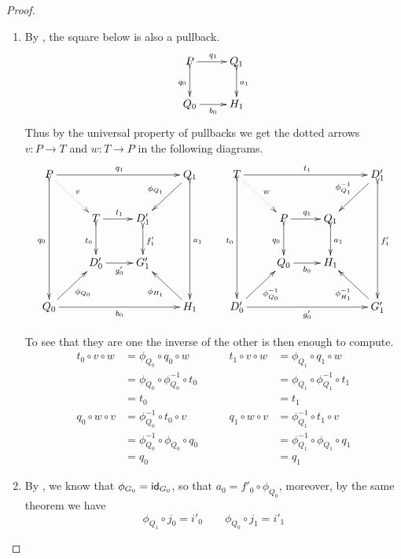 \begin{proof}
	\begin{enumerate}
		\item  By , the square below is also a pullback.
			\[\xymatrix{P \ar[r]^{q_1} \ar@{>->}[d]_{q_0} & Q_1 \ar@{>->}[d]^{a_1}\\ Q_0 \ar[r]_{b_0} & H_1}\]
			Thus by the universal property of pullbacks  we get the dotted arrows $v\colon P\to T$ and $w\colon T\to P$ in the following diagrams.
		\[\xymatrix{ P \ar@{.>}[dr]^{v} \ar[rrr]^{q_1} \ar@{>->}[ddd]_{q_0}&&& Q_1 \ar@{>->}[ddd]^{a_1} \ar[dl]_{\phi_{Q_1}}& T\ar@{.>}[dr]^{w}  \ar[rrr]^{t_1} \ar@{>->}[ddd]_{t_0}&&& D'_1 \ar[dl]_{\phi^{-1}_{Q_1}} \ar@{>->}[ddd]^{f'_1}\\&T \ar@{>->}[d]_{t_0}\ar[r]^{t_1}& D'_1 \ar@{>->}[d]^{f'_1} &&& P \ar@{>->}[d]_{q_0}\ar[r]^{q_1}& Q_1\ar@{>->}[d]^{a_1}\\ & D'_0\ar[r]_{g'_0} & G'_1 &&& Q_0 \ar[r]_{b_0}& H_1 \\Q_0 \ar[rrr]_{b_0} \ar[ur]_{\phi_{Q_0}}&&& H_1 \ar[ul]^{\phi_{H_1}} & D'_0 \ar[rrr]_{g'_0} \ar[ur]_{\phi^{-1}_{Q_0}}&&&G'_1 \ar[ul]^{\phi^{-1}_{H_1}}}\]

To see that they are one the inverse of the other is then enough to compute.
		\[\begin{split}
		t_0\circ v\circ w &=\phi_{Q_0}\circ q_0\circ w\\&=\phi_{Q_0}\circ \phi^{-1}_{Q_0} \circ t_0\\&=t_0\\q_0\circ w\circ v&=\phi^{-1}_{Q_0}	\circ t_0\circ v\\&=\phi^{-1}_{Q_0} \circ \phi_{Q_0}\circ q_0\\&=q_0 	\end{split}\qquad \begin{split}
		t_1\circ v\circ w &=\phi_{Q_1}\circ q_1\circ w\\&=\phi_{Q_1}\circ \phi^{-1}_{Q_1} \circ t_1\\&=t_1\\q_1\circ w\circ v&=\phi^{-1}_{Q_1}	\circ t_1\circ v\\&=\phi^{-1}_{Q_1} \circ \phi_{Q_1}\circ q_1\\&=q_1
		\end{split}\]
		
	\item By , we know that $\phi_{G_0}=\mathsf{id}_{G_0}$, so that $a_0=f'_0\circ \phi_{Q_0}$, moreover, by the same theorem we have 
	\[\phi_{Q_1}\circ j_0=i'_0 \qquad  \phi_{Q_0}\circ j_1=i'_1\] 
		

\end{enumerate}
\end{proof}
